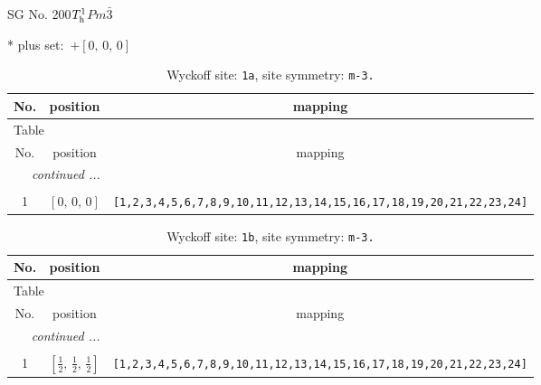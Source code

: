 \documentclass[fleqn,8pt]{jsarticle}
\begin{document}
\setcounter{MaxMatrixCols}{32}

\renewcommand{\tablename}{Table~}
\renewcommand{\figurename}{Figure~}
\begin{center}
\LARGE
SG No. 200\quad$T_{\rm h}^{1}$\quad$Pm\bar{3}$\quad[ cubic ]
\end{center}
* plus set:\,\,\,$+\left[ 0,\, 0,\, 0 \right]$
\renewcommand{\arraystretch}{1.2}
\begin{longtable}{ccc}
\caption{Wyckoff site: {\tt 1a}, site symmetry: {\tt m-3.}}
 \\
 \hline \hline
No. & position & mapping \\ \hline \endfirsthead

\multicolumn{2}{l}{\tablename\ \thetable{}} \\
 \hline \hline
No. & position & mapping \\ \hline \endhead

 \hline \hline
\multicolumn{2}{r}{\footnotesize\it continued ...} \\ \endfoot

 \hline \hline
\multicolumn{2}{r}{} \\ \endlastfoot

1 & $\left[ 0,\, 0,\, 0 \right]$ & {\tt [1,2,3,4,5,6,7,8,9,10,11,12,13,14,15,16,17,18,19,20,21,22,23,24]} \\
\end{longtable}
\renewcommand{\arraystretch}{1.2}
\begin{longtable}{ccc}
\caption{Wyckoff site: {\tt 1b}, site symmetry: {\tt m-3.}}
 \\
 \hline \hline
No. & position & mapping \\ \hline \endfirsthead

\multicolumn{2}{l}{\tablename\ \thetable{}} \\
 \hline \hline
No. & position & mapping \\ \hline \endhead

 \hline \hline
\multicolumn{2}{r}{\footnotesize\it continued ...} \\ \endfoot

 \hline \hline
\multicolumn{2}{r}{} \\ \endlastfoot

1 & $\left[ \frac{1}{2},\, \frac{1}{2},\, \frac{1}{2} \right]$ & {\tt [1,2,3,4,5,6,7,8,9,10,11,12,13,14,15,16,17,18,19,20,21,22,23,24]} \\
\end{longtable}
\renewcommand{\arraystretch}{1.2}
\end{document}
